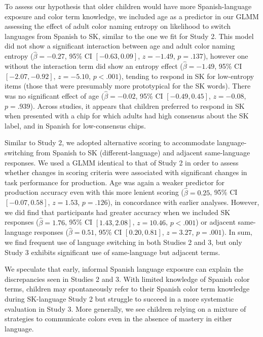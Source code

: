 \documentclass[
  ,apa7,floatsintext]{apa6}
\begin{document}
To assess our hypothesis that older children would have more Spanish-language exposure and color term knowledge, we included age as a predictor in our GLMM assessing the effect of adult color naming entropy on likelihood to switch languages from Spanish to SK, similar to the one we fit for Study 2. This model did not show a significant interaction between age and adult color naming entropy (\(\hat{\beta} = -0.27\), 95\% CI \([-0.63, 0.09]\), \(z = -1.49\), \(p = .137\)), however one without the interaction term did show an entropy effect (\(\hat{\beta} = -1.49\), 95\% CI \([-2.07, -0.92]\), \(z = -5.10\), \(p < .001\)), tending to respond in SK for low-entropy items (those that were presumably more prototypical for the SK words). There was no significant effect of age (\(\hat{\beta} = -0.02\), 95\% CI \([-0.49, 0.45]\), \(z = -0.08\), \(p = .939\)). Across studies, it appears that children preferred to respond in SK when presented with a chip for which adults had high consensus about the SK label, and in Spanish for low-consensus chips.

Similar to Study 2, we adopted alternative scoring to accommodate language-switching from Spanish to SK (different-language) and adjacent same-language responses. We used a GLMM identical to that of Study 2 in order to assess whether changes in scoring criteria were associated with significant changes in task performance for production. Age was again a weaker predictor for production accuracy even with this more lenient scoring (\(\hat{\beta} = 0.25\), 95\% CI \([-0.07, 0.58]\), \(z = 1.53\), \(p = .126\)), in concordance with earlier analyses. However, we did find that participants had greater accuracy when we included SK responses (\(\hat{\beta} = 1.76\), 95\% CI \([1.43, 2.08]\), \(z = 10.46\), \(p < .001\)) or adjacent same-language responses (\(\hat{\beta} = 0.51\), 95\% CI \([0.20, 0.81]\), \(z = 3.27\), \(p = .001\)). In sum, we find frequent use of language switching in both Studies 2 and 3, but only Study 3 exhibits significant use of same-language but adjacent terms.

We speculate that early, informal Spanish language exposure can explain the discrepancies seen in Studies 2 and 3. With limited knowledge of Spanish color terms, children may spontaneously refer to their Spanish color term knowledge during SK-language Study 2 but struggle to succeed in a more systematic evaluation in Study 3. More generally, we see children relying on a mixture of strategies to communicate colors even in the absence of mastery in either language.
\end{document}
